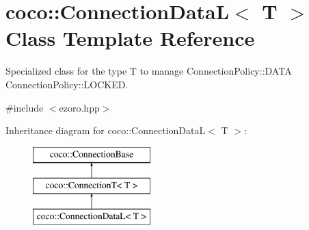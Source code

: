 \hypertarget{classcoco_1_1_connection_data_l}{\section{coco\-:\-:Connection\-Data\-L$<$ T $>$ Class Template Reference}
\label{classcoco_1_1_connection_data_l}
}


Specialized class for the type T to manage Connection\-Policy\-::\-D\-A\-T\-A Connection\-Policy\-::\-L\-O\-C\-K\-E\-D.  




{\ttfamily \#include $<$ezoro.\-hpp$>$}

Inheritance diagram for coco\-:\-:Connection\-Data\-L$<$ T $>$\-:\begin{figure}[H]
\begin{center}
\leavevmode
\includegraphics[height=3.000000cm]{classcoco_1_1_connection_data_l}
\end{center}
\end{figure}
